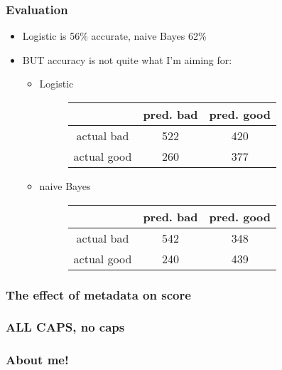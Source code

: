 \documentclass{beamer}
\begin{document}
\begin{frame}
\frametitle{Evaluation}

\begin{itemize}
\item Logistic is 56\% accurate, naive Bayes 62\%
\pause
\item BUT accuracy is not quite what I'm aiming for:
\pause
\begin{itemize}
\item Logistic
\begin{figure}
\begin{tabular}{c|cc}
& pred. bad & pred. good \\
\hline
actual bad &  522 &  420 \\
actual good &  260 &  377
\end{tabular}
\end{figure}
\pause
\item naive Bayes
\begin{figure}
\begin{tabular}{c|cc}
& pred. bad & pred. good \\
\hline
actual bad &  542 &  348 \\
actual good &  240 &  439
\end{tabular}
\end{figure}
\end{itemize}
\end{itemize}



\end{frame}

\begin{frame}
\frametitle{The effect of metadata on score}

\begin{figure}[h]
\centering
{}
\end{figure}

\end{frame}


\begin{frame}
\frametitle{ALL CAPS, no caps}

\begin{figure}[h]
\centering
{}
\end{figure}

\end{frame}

\begin{frame}
\frametitle{About me!}

\begin{figure}[h]
\centering
{}
\end{figure}

\end{frame}
\end{document}
